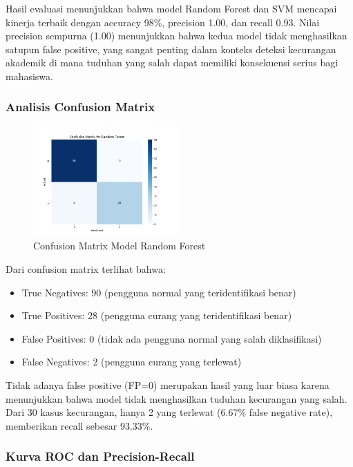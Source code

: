 Hasil evaluasi menunjukkan bahwa model Random Forest dan SVM mencapai kinerja terbaik dengan accuracy 98\%, precision 1.00, dan recall 0.93. Nilai precision sempurna (1.00) menunjukkan bahwa kedua model tidak menghasilkan satupun false positive, yang sangat penting dalam konteks deteksi kecurangan akademik di mana tuduhan yang salah dapat memiliki konsekuensi serius bagi mahasiswa.

\subsubsection{Analisis Confusion Matrix}

\begin{figure}[htbp]
    \centering
    \includegraphics[width=0.5\textwidth]{figures/confusion_matrix_Random Forest.png}
    \caption{Confusion Matrix Model Random Forest}
    \label{fig:confusionMatrix}
\end{figure}

Dari confusion matrix terlihat bahwa:
\begin{itemize}
    \item True Negatives: 90 (pengguna normal yang teridentifikasi benar)
    \item True Positives: 28 (pengguna curang yang teridentifikasi benar)
    \item False Positives: 0 (tidak ada pengguna normal yang salah diklasifikasi)
    \item False Negatives: 2 (pengguna curang yang terlewat)
\end{itemize}

Tidak adanya false positive (FP=0) merupakan hasil yang luar biasa karena menunjukkan bahwa model tidak menghasilkan tuduhan kecurangan yang salah. Dari 30 kasus kecurangan, hanya 2 yang terlewat (6.67\% false negative rate), memberikan recall sebesar 93.33\%.

\subsubsection{Kurva ROC dan Precision-Recall}

